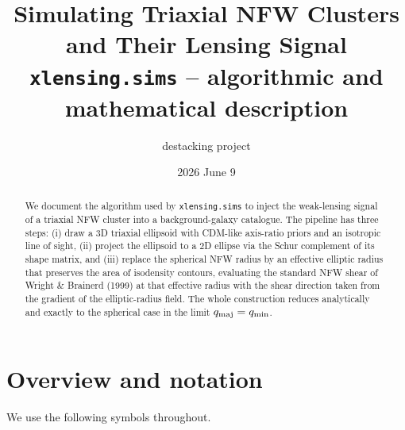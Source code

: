 \documentclass[11pt,a4paper]{article}
\title{\textbf{Simulating Triaxial NFW Clusters and Their Lensing Signal}\\[0.4em]
\large \texttt{xlensing.sims} -- algorithmic and mathematical description}
\author{destacking project}
\date{2026 June 9}
\begin{document}
\maketitle

\begin{abstract}
We document the algorithm used by \texttt{xlensing.sims} to inject the
weak-lensing signal of a triaxial NFW cluster into a background-galaxy
catalogue. The pipeline has three steps: (i) draw a 3D triaxial ellipsoid
with CDM-like axis-ratio priors and an isotropic line of sight, (ii)
project the ellipsoid to a 2D ellipse via the Schur complement of its
shape matrix, and (iii) replace the spherical NFW radius by an
effective elliptic radius that preserves the area of isodensity contours,
evaluating the standard NFW shear of Wright \& Brainerd (1999) at that
effective radius with the shear direction taken from the gradient of the
elliptic-radius field. The whole construction reduces analytically and
exactly to the spherical case in the limit $q_{\rm maj} = q_{\rm min}$.
\end{abstract}

\tableofcontents
\bigskip


\section{Overview and notation}

We use the following symbols throughout.
\end{document}
